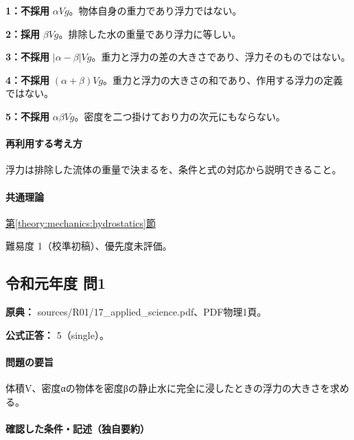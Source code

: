 \noindent\textbf{1：不採用} \(\alpha Vg\)。物体自身の重力であり浮力ではない。\par

\noindent\textbf{2：採用} \(\beta Vg\)。排除した水の重量であり浮力に等しい。\par

\noindent\textbf{3：不採用} \(|\alpha-\beta|Vg\)。重力と浮力の差の大きさであり、浮力そのものではない。\par

\noindent\textbf{4：不採用} \((\alpha+\beta)Vg\)。重力と浮力の大きさの和であり、作用する浮力の定義ではない。\par

\noindent\textbf{5：不採用} \(\alpha\beta Vg\)。密度を二つ掛けており力の次元にもならない。\par

\paragraph{再利用する考え方} 浮力は排除した流体の重量で決まるを、条件と式の対応から説明できること。

\paragraph{共通理論} \hyperref[theory:mechanics:hydrostatics]{第\ref*{theory:mechanics:hydrostatics}節}

\par 難易度 1（校準初稿）、優先度未評価。

\subsection{令和元年度 問1}
\label{q:r01-reg-applied-01}

\noindent\textbf{原典：} sources/R01/17\_applied\_science.pdf、PDF物理1頁。

\textbf{公式正答：} 5（single）。

\paragraph{問題の要旨} 体積V、密度αの物体を密度βの静止水に完全に浸したときの浮力の大きさを求める。

\paragraph{確認した条件・記述（独自要約）}\mbox{}\par

